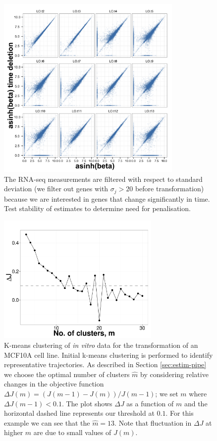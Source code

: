 \begin{figure}
  \centering
  \includegraphics[width=0.8\textwidth]{pics/no-pen-data.png}
  \caption{The RNA-seq measurements are filtered with respect to standard deviation (we filter out genes with $\sigma_j > 20$ before transformation) because we are interested in genes that change significantly in time. Test stability of estimates to determine need for penalisation.}
  \label{fig:data-pen}
\end{figure}

\begin{figure}
  \centering
  \includegraphics[width=0.7\textwidth]{pics/kmeans-dat.pdf}
  \caption{K-means clustering of {\it in vitro} data for the transformation of an MCF10A cell line. Initial k-means clustering is performed to identify representative trajectories. As described in Section \ref{sec:estim-pipe} we choose the optimal number of clusters $\hat{m}$ by considering relative changes in the objective function $\Delta J (m) = (J(m-1) - J(m))/J(m-1)$; we set $m$ where $\Delta J(m-1) < 0.1$. The plot shows $\Delta J$ as a function of $m$ and the horizontal dashed line represents our threshold at $0.1$. For this example we can see that the $\hat{m} = 13$. Note that fluctuation in $\Delta J$ at higher $m$ are due to small values of $J(m)$. }
  \label{fig:kmeans-dat}
\end{figure}

